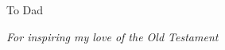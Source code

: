 \vspace*{.16666\textheight}

{\noindent To Dad}

\medskip

{\noindent \textit{For inspiring my love of the Old Testament}}
